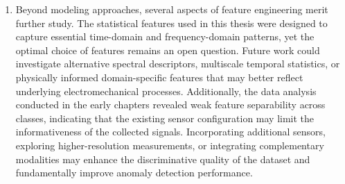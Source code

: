 \begin{enumerate}
    \item Beyond modeling approaches, several aspects of feature engineering merit further study. The statistical features used in this thesis were designed to capture essential time-domain and frequency-domain patterns, yet the optimal choice of features remains an open question. Future work could investigate alternative spectral descriptors, multiscale temporal statistics, or physically informed domain-specific features that may better reflect underlying electromechanical processes. Additionally, the data analysis conducted in the early chapters revealed weak feature separability across classes, indicating that the existing sensor configuration may limit the informativeness of the collected signals. Incorporating additional sensors, exploring higher-resolution measurements, or integrating complementary modalities may enhance the discriminative quality of the dataset and fundamentally improve anomaly detection performance.
\end{enumerate}
